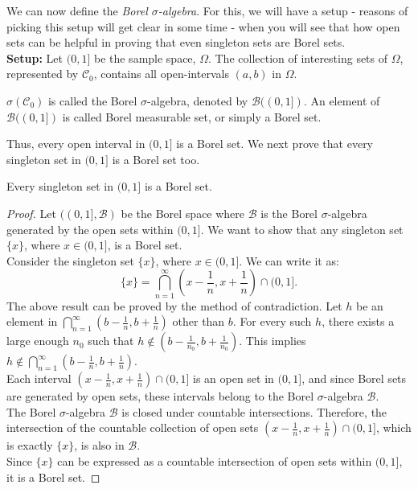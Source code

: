  
We can now define the \textit{Borel $\sigma$-algebra}. For this, we will have a setup - reasons of picking this setup will get clear in some time - when you will see that how open sets can be helpful in proving that even singleton sets are Borel sets.\\

\textbf{Setup:} Let $(0, 1]$ be the sample space, $\Omega$. The collection of interesting sets of $\Omega$, represented by $\mathcal{C}_0$, contains all open-intervals $(a, b)$ in $\Omega$.

\begin{definition}
   $\sigma(\mathcal{C}_0)$ is called the Borel $\sigma$-algebra, denoted by $\mathcal{B}((0, 1])$. An element of $\mathcal{B}((0, 1])$ is called Borel measurable set, or simply a Borel set.
\end{definition}

Thus, every open interval in $(0, 1]$ is a Borel set. We next prove that every singleton set in $(0, 1]$ is a Borel set too. 

\begin{theorem}
   Every singleton set in $(0, 1]$ is a Borel set.
\end{theorem}

\begin{proof}
   Let $((0, 1], \mathcal{B})$ be the Borel space where $\mathcal{B}$ is the Borel $\sigma$-algebra generated by the open sets within $(0, 1]$. We want to show that any singleton set $\{x\}$, where $x \in (0, 1]$, is a Borel set.\\
   
   Consider the singleton set $\{x\}$, where $x \in (0, 1]$. We can write it as:
   \[
   \{x\} = \bigcap_{n=1}^{\infty} \left( x - \frac{1}{n}, x + \frac{1}{n} \right) \cap (0, 1].
   \]
   The above result can be proved by the method of contradiction. Let $h$ be an element in $\bigcap_{n=1}^{\infty} \left( b - \frac{1}{n}, b + \frac{1}{n} \right)$ other than $b$. For every such $h$, there exists a large enough $n_0$ such that $h \notin \left( b - \frac{1}{n_0}, b + \frac{1}{n_0} \right)$. This implies $h \notin \bigcap_{n=1}^{\infty} \left( b - \frac{1}{n}, b + \frac{1}{n} \right)$.\\
   
   Each interval $\left( x - \frac{1}{n}, x + \frac{1}{n} \right) \cap (0, 1]$ is an open set in $(0, 1]$, and since Borel sets are generated by open sets, these intervals belong to the Borel $\sigma$-algebra $\mathcal{B}$.\\
   
   The Borel $\sigma$-algebra $\mathcal{B}$ is closed under countable intersections. Therefore, the intersection of the countable collection of open sets $\left( x - \frac{1}{n}, x + \frac{1}{n} \right) \cap (0, 1]$, which is exactly $\{x\}$, is also in $\mathcal{B}$.\\
   
   Since $\{x\}$ can be expressed as a countable intersection of open sets within $(0, 1]$, it is a Borel set.

\end{proof}


